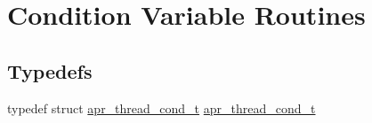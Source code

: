 \hypertarget{group__apr__thread__cond}{}\section{Condition Variable Routines}
\label{group__apr__thread__cond}
\subsection*{Typedefs}
\begin{DoxyCompactItemize}
\item 
typedef struct \hyperlink{group__apr__thread__cond_gae8f918d38bf1c58bc09670eee456ae5e}{apr\+\_\+thread\+\_\+cond\+\_\+t} \hyperlink{group__apr__thread__cond_gae8f918d38bf1c58bc09670eee456ae5e}{apr\+\_\+thread\+\_\+cond\+\_\+t}
\end{DoxyCompactItemize}
